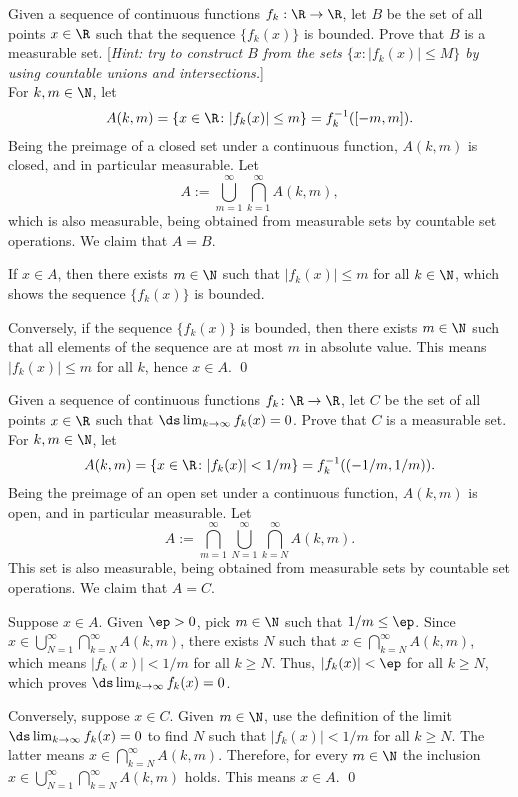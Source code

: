 \begin{hwsol}
Given a sequence of continuous functions $f_k: \R \to \R$, let $B$ be the set of all points $x \in \R$ such that the sequence $\{ f_k(x) \}$ is bounded. Prove that $B$ is a measurable set. [\emph{Hint: try to construct $B$ from the sets $\{x \colon |f_k(x)| \leq M\}$ by using countable unions and intersections.}] \\

\pf For $k, m \in \N$, let 
        \[ 
        A(k, m) = \{ x \in \R \colon |f_k(x)| \leq m \}= f_k^{-1}([-m, m]).
        \]
Being the preimage of a closed set under a continuous function, $A(k, m)$ is closed, and in particular measurable. Let
        \[
        A:= \bigcup_{m=1}^\infty \bigcap_{k=1}^\infty A(k, m),
        \]
which is also measurable, being obtained from measurable sets by countable set operations. We claim that $A=B$. 

If $x \in A$, then there exists $m \in \N$ such that $|f_k(x)| \leq m$ for all $k \in \N$, which shows the sequence $\{ f_k(x) \}$ is bounded. 

Conversely, if the sequence $\{ f_k(x) \}$ is bounded, then there exists $m \in \N$ such that all elements of the sequence are at most $m$ in absolute value. This means $|f_k(x)| \leq m$ for all $k$, hence $x \in A$. \qed \\
\end{hwsol}


\begin{hwsol}
Given a sequence of continuous functions $f_k \colon \R \to \R$, let $C$ be the set of all points $x \in \R$ such that $\ds \lim_{k \to \infty} f_k(x)= 0$. Prove that $C$ is a measurable set. \\

\pf For $k, m \in \N$, let 
        \[ 
        A(k, m) = \{ x \in \R \colon |f_k(x)| < 1/m \} = f_k^{-1}((-1/m, 1/m)).
        \]
Being the preimage of an open set under a continuous function, $A(k, m)$ is open, and in particular measurable. Let
        \[
        A:=  \bigcap_{m=1}^\infty \bigcup_{N=1}^\infty \bigcap_{k=N}^\infty A(k, m).
        \]
This set is also measurable, being obtained from measurable sets by countable set operations. We claim that $A=C$. 

Suppose $x \in A$. Given $\ep>0$, pick $m \in \N$ such that $1/m \leq \ep$. Since $x \in \bigcup_{N=1}^\infty \bigcap_{k=N}^\infty A(k, m)$, there exists $N$ such that $x \in \bigcap_{k=N}^\infty A(k, m)$, which means $|f_k(x)|< 1/m$ for all $k \geq N$. Thus, $|f_k(x)|< \ep$ for all $k \geq N$, which proves $\ds\lim_{k \to \infty} f_k(x) = 0$. 

Conversely, suppose $x \in C$. Given $m \in \N$, use the definition of the limit $\ds\lim_{k \to \infty} f_k(x)= 0$ to find $N$ such that $|f_k(x)|< 1/m$ for all $k \geq N$. The latter means $x \in \bigcap_{k=N}^\infty A(k, m)$. Therefore, for every $m \in \N$ the inclusion $x \in \bigcup_{N=1}^\infty \bigcap_{k=N}^\infty A(k, m)$ holds. This means $x \in A$. \qed \\
\end{hwsol}


